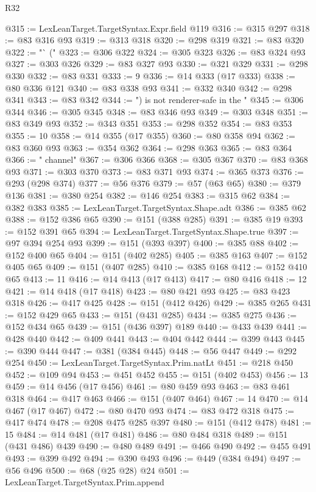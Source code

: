 \begin{lexlean}{R32}
\begin{coremodule}
@315 := LexLeanTarget.TargetSyntax.Expr.field @119
@316 := @315 @297
@318 := @83 @316 @93
@319 := @313 @318
@320 := @298 @319
@321 := @83 @320
@322 := "` ("
@323 := @306 @322
@324 := @305 @323
@326 := @83 @324 @93
@327 := @303 @326
@329 := @83 @327 @93
@330 := @321 @329
@331 := @298 @330
@332 := @83 @331
@333 := 9
@336 := @14 @333 (@17 @333)
@338 := @80 @336 @121
@340 := @83 @338 @93
@341 := @332 @340
@342 := @298 @341
@343 := @83 @342
@344 := ") is not renderer-safe in the "
@345 := @306 @344
@346 := @305 @345
@348 := @83 @346 @93
@349 := @303 @348
@351 := @83 @349 @93
@352 := @343 @351
@353 := @298 @352
@354 := @83 @353
@355 := 10
@358 := @14 @355 (@17 @355)
@360 := @80 @358 @94
@362 := @83 @360 @93
@363 := @354 @362
@364 := @298 @363
@365 := @83 @364
@366 := " channel"
@367 := @306 @366
@368 := @305 @367
@370 := @83 @368 @93
@371 := @303 @370
@373 := @83 @371 @93
@374 := @365 @373
@376 := @293 (@298 @374)
@377 := @56 @376
@379 := @57 (@63 @65)
@380 := @379 @136
@381 := @380 @254
@382 := @146 @254
@383 := @315 @62
@384 := @382 @383
@385 := LexLeanTarget.TargetSyntax.Shape.adt
@386 := @385 @62
@388 := @152 @386 @65
@390 := @151 (@388 @285)
@391 := @385 @19
@393 := @152 @391 @65
@394 := LexLeanTarget.TargetSyntax.Shape.true
@397 := @97 @394 @254 @93
@399 := @151 (@393 @397)
@400 := @385 @88
@402 := @152 @400 @65
@404 := @151 (@402 @285)
@405 := @385 @163
@407 := @152 @405 @65
@409 := @151 (@407 @285)
@410 := @385 @168
@412 := @152 @410 @65
@413 := 11
@416 := @14 @413 (@17 @413)
@417 := @80 @416
@418 := 12
@421 := @14 @418 (@17 @418)
@423 := @80 @421 @93
@425 := @83 @423 @318
@426 := @417 @425
@428 := @151 (@412 @426)
@429 := @385 @265
@431 := @152 @429 @65
@433 := @151 (@431 @285)
@434 := @385 @275
@436 := @152 @434 @65
@439 := @151 (@436 @397) @189
@440 := @433 @439
@441 := @428 @440
@442 := @409 @441
@443 := @404 @442
@444 := @399 @443
@445 := @390 @444
@447 := @381 (@384 @445)
@448 := @56 @447
@449 := @292 @254
@450 := LexLeanTarget.TargetSyntax.Prim.natLt
@451 := @218 @450
@452 := @109 @94
@453 := @451 @452
@455 := @151 (@402 @453)
@456 := 13
@459 := @14 @456 (@17 @456)
@461 := @80 @459 @93
@463 := @83 @461 @318
@464 := @417 @463
@466 := @151 (@407 @464)
@467 := 14
@470 := @14 @467 (@17 @467)
@472 := @80 @470 @93
@474 := @83 @472 @318
@475 := @417 @474
@478 := @208 @475 @285 @397
@480 := @151 (@412 @478)
@481 := 15
@484 := @14 @481 (@17 @481)
@486 := @80 @484 @318
@489 := @151 (@431 @486) @439
@490 := @480 @489
@491 := @466 @490
@492 := @455 @491
@493 := @399 @492
@494 := @390 @493
@496 := @449 (@384 @494)
@497 := @56 @496
@500 := @68 (@25 @28) @24
@501 := LexLeanTarget.TargetSyntax.Prim.append

\end{coremodule}
\end{lexlean}

